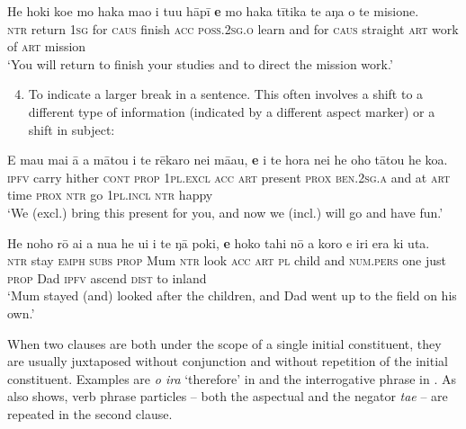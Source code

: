 \ea\label{ex:11.10}
\gll He hoki koe mo haka mao i tu{\ꞌ}u hāpī \textbf{{\ꞌ}e} mo haka tītika  te aŋa o te misione.\\
\textsc{ntr} return \textsc{1sg} for \textsc{caus} finish \textsc{acc} \textsc{poss.2sg.o} learn and for \textsc{caus} straight  \textsc{art} work of \textsc{art} mission\\

\glt
‘You will return to finish your studies and to direct the mission work.’ \textstyleExampleref{[R231.244]} 
\z

\begin{enumerate}
\setcounter{enumi}{3}
\item 
To indicate a larger break in a sentence. This often involves a shift to a different type of information (indicated by a different aspect marker) or a shift in subject:
\end{enumerate}

\ea\label{ex:11.11}
\gll E ma{\ꞌ}u mai {\ꞌ}ā a mātou i te rēkaro nei mā{\ꞌ}au,  \textbf{{\ꞌ}e} {\ꞌ}i te hora nei he oho tātou he koa.\\
\textsc{ipfv} carry hither \textsc{cont} \textsc{prop} \textsc{1pl.excl} \textsc{acc} \textsc{art} present \textsc{prox} \textsc{ben.2sg.a}  and at \textsc{art} time \textsc{prox} \textsc{ntr} go \textsc{1pl.incl} \textsc{ntr} happy\\

\glt 
‘We (excl.) bring this present for you, and now we (incl.) will go and have fun.’ \textstyleExampleref{[R210.127]} 
\z

\ea\label{ex:11.12}
\gll He noho rō {\ꞌ}ai a nua he u{\ꞌ}i i te ŋā poki,  \textbf{{\ꞌ}e} hoko tahi nō a koro e iri era ki {\ꞌ}uta.\\
\textsc{ntr} stay \textsc{emph} \textsc{subs} \textsc{prop} Mum \textsc{ntr} look \textsc{acc} \textsc{art} \textsc{pl} child  and \textsc{num.pers} one just \textsc{prop} Dad \textsc{ipfv} ascend \textsc{dist} to inland\\

\glt
‘Mum stayed (and) looked after the children, and Dad went up to the field on his own.’ \textstyleExampleref{[R235.080]} 
\z


When two clauses are both under the scope of a single initial constituent, they are usually juxtaposed without conjunction and without repetition of the initial constituent. Examples are \textit{{\ꞌ}o ira} ‘therefore’ in  and the interrogative phrase in . As  also shows, verb phrase particles – both the aspectual and the negator \textit{ta{\ꞌ}e} – are repeated in the second clause.

